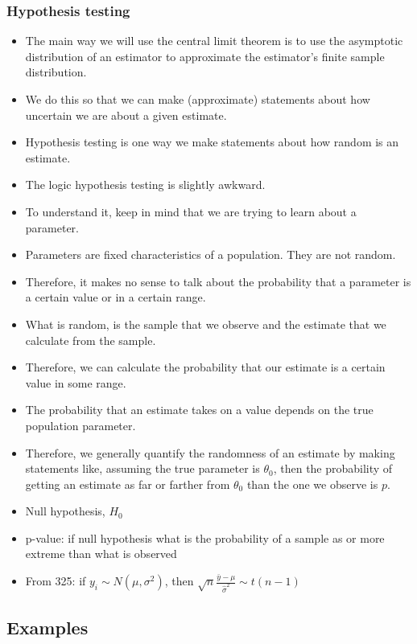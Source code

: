 \begin{frame}[allowframebreaks] 
  \frametitle{Hypothesis testing}
  \begin{itemize}
  \item The main way we will use the central limit theorem is to use the
asymptotic distribution of an estimator to approximate the estimator's
finite sample distribution. 

\item We do this so that we can make
(approximate) statements about how uncertain we are about a given
estimate. 

\item Hypothesis testing is one way we make statements about how random is
an estimate. 
\item The logic hypothesis testing is slightly awkward. 
\item To understand it, keep in mind that we are trying to learn about a
parameter.
\item  Parameters are fixed characteristics of a population. They
are not random. 
\item Therefore, it makes no sense to talk about the
probability that a parameter is a certain value or in a certain
range. 
\item What is random, is the sample that we observe and the estimate
that we calculate from the sample. 
\item Therefore, we can calculate the
probability that our estimate is a certain value in some range. 
\item The probability that an estimate takes on a value depends on the true
population parameter. 
\item Therefore, we generally quantify the randomness
of an estimate by making statements like, assuming the true parameter
is $\theta_0$, then the probability of getting an estimate as far or
farther from $\theta_0$ than the one we observe is $p$. 


  \item \alert{Null hypothesis}, $H_0$
  \item \alert{p-value}: if null hypothesis what is the probability of
    a sample as or more extreme than what is observed
  \item From 325: if $y_i \sim N(\mu,\sigma^2)$, then $\sqrt{n}
    \frac{\bar{y} - \mu}{\hat{\sigma}^2} \sim t(n-1)$ 
  \end{itemize}
\end{frame}

\subsection{Examples}

